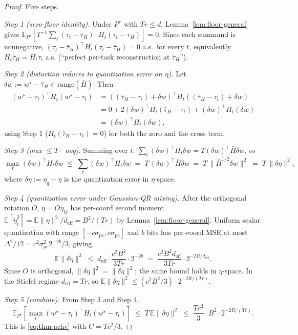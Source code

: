 \documentclass{article}
\theoremstyle{remark}
\newcommand{\E}{\mathbb{E}}
\newcommand{\range}{\mathrm{range}}
\newcommand{\deff}{d_{\mathrm{eff}}}
\newcommand{\tauH}{\bar\tau_{H}}
\newcommand{\Hbar}{\bar H}
\begin{document}
\begin{proof}
Five steps.

\emph{Step 1 (zero-floor identity).} Under $P^\star$ with $Tr\leq d$,
Lemma~\ref{lem:floor-general} gives
$\E_{P^\star}[T^{-1}\sum_t(\tau_t-\tauH)^\top H_t(\tau_t-\tauH)] = 0$.
Since each summand is nonnegative, $(\tau_t-\tauH)^\top H_t
(\tau_t-\tauH) = 0$ a.s.\ for every $t$, equivalently $H_t\tauH =
H_t\tau_t$ a.s. (``perfect per-task reconstruction at $\tauH$'').

\emph{Step 2 (distortion reduces to quantization error on $\eta$).}
Let $\delta w := w^\star-\tauH\in\range(\Hbar)$. Then
\begin{align*}
  (w^\star-\tau_t)^\top H_t(w^\star-\tau_t)
  &= ((\tauH-\tau_t)+\delta w)^\top H_t((\tauH-\tau_t)+\delta w) \\
  &= 0 + 2(\delta w)^\top H_t(\tauH-\tau_t) + (\delta w)^\top H_t(\delta w) \\
  &= (\delta w)^\top H_t(\delta w),
\end{align*}
using Step 1 ($H_t(\tauH-\tau_t) = 0$) for both the zero and the
cross term.

\emph{Step 3 (max $\leq T\cdot$ avg).} Summing over $t$:
$\sum_t (\delta w)^\top H_t \delta w = T(\delta w)^\top\bar H \delta w$,
so
\[
  \max_t (\delta w)^\top H_t \delta w \;\leq\;
  \sum_t (\delta w)^\top H_t \delta w \;=\;
  T\,(\delta w)^\top\bar H \delta w \;=\; T\,\|\bar H^{1/2}\delta w\|^2
  \;=\; T\,\|\delta\eta\|^2,
\]
where $\delta\eta := \eta_q - \eta$ is the quantization error in
$\eta$-space.

\emph{Step 4 (quantization error under Gaussian-QR mixing).} After
the orthogonal rotation $O$, $\tilde\eta = O\eta_Q$ has per-coord
second moment $\E[\tilde\eta_i^2] = \E\|\eta\|^2/\deff = B^2/(Tr)$
by Lemma~\ref{lem:floor-general}. Uniform scalar quantization with
range $[-c\sigma_{\mathrm{pc}},c\sigma_{\mathrm{pc}}]$ and $b$ bits
has per-coord MSE at most $\Delta^2/12 = c^2\sigma_{\mathrm{pc}}^2
2^{-2b}/3$, giving
\[
  \E\|\delta\tilde\eta\|^2 \;\leq\; \deff\cdot\frac{c^2 B^2}{3Tr}\cdot 2^{-2b}
  \;=\; \frac{c^2 B^2\deff}{3Tr}\cdot 2^{-2R/\deff}.
\]
Since $O$ is orthogonal, $\|\delta\eta\|^2 = \|\delta\tilde\eta\|^2$;
the same bound holds in $\eta$-space. In the Stiefel regime
$\deff = Tr$, so
$\E\|\delta\eta\|^2 \leq (c^2 B^2/3)\cdot 2^{-2R/(Tr)}$.

\emph{Step 5 (combine).} From Step 3 and Step 4,
\[
  \E_{P^\star}[\max_t(w^\star-\tau_t)^\top H_t(w^\star-\tau_t)]
  \;\leq\; T\,\E\|\delta\eta\|^2
  \;\leq\; \frac{T c^2}{3}\cdot B^2\cdot 2^{-2R/(Tr)}.
\]
This is \eqref{eq:thm-achv} with $C = Tc^2/3$.
\end{proof}
\end{document}
